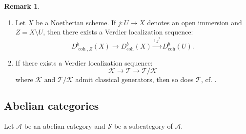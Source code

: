\documentclass[11pt]{amsart}
\theoremstyle{plain}
\theoremstyle{definition}
\newtheorem{remark}[theorem]{Remark}
\numberwithin{equation}{section}
\numberwithin{theorem}{section}
\begin{document}
\begin{remark}\label{rmk:scheme_verdier_localization_ELS}
    \hfill
    \begin{enumerate}
        \item Let $X$ be a Noetherian scheme. If $j\colon U \to X$ denotes an open immersion and $Z= X \setminus U$, then there exists a Verdier localization sequence:
        \begin{displaymath}
            D^b_{\operatorname{coh},Z}(X) \to D^b_{\operatorname{coh}}(X)\xrightarrow{\mathbb{L}j^\ast} D^b_{\operatorname{coh}}(U).
        \end{displaymath}
        \item If there exists a Verdier localization sequence:
        \begin{displaymath}
            \mathcal{K} \to \mathcal{T} \to \mathcal{T}/\mathcal{K}
        \end{displaymath}
        where $\mathcal{K}$ and $\mathcal{T}/\mathcal{K}$ admit classical generators, then so does $\mathcal{T}$, cf. \cite[Proposition 4.3]{Elagin/Lunts/Schnurer:2020}.
    \end{enumerate}
\end{remark}

\subsection{Abelian categories}
\label{sec:generation_abelian}

Let $\mathcal{A}$ be an abelian category and $\mathcal{S}$ be a subcategory of $\mathcal{A}$. 
\end{document}
